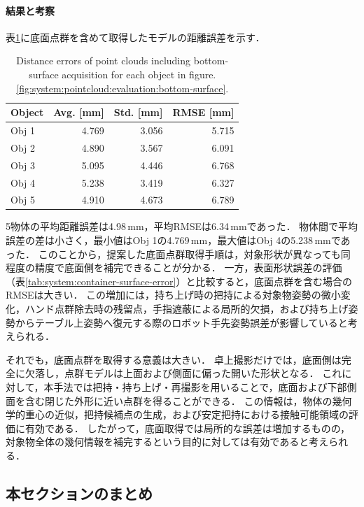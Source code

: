 \paragraph{結果と考察}

表\ref{tab:system:bottom-pointcloud}に底面点群を含めて取得したモデルの距離誤差を示す．

\begin{table}[t]
  \centering
  \caption{Distance errors of point clouds including bottom-surface acquisition for each object in figure.\ref{fig:system:pointcloud:evaluation:bottom-surface}.}
  \label{tab:system:bottom-pointcloud}
  \small
  \begin{tabular}{lrrr}
    \toprule
    \textbf{Object} & \textbf{Avg. [mm]} & \textbf{Std. [mm]} & \textbf{RMSE [mm]} \\
    \midrule
    Obj 1 & 4.769 & 3.056 & 5.715 \\
    Obj 2 & 4.890 & 3.567 & 6.091 \\
    Obj 3 & 5.095 & 4.446 & 6.768 \\
    Obj 4 & 5.238 & 3.419 & 6.327 \\
    Obj 5 & 4.910 & 4.673 & 6.789 \\
    \bottomrule
  \end{tabular}
\end{table}

5物体の平均距離誤差は4.98\,mm，平均RMSEは6.34\,mmであった．
物体間で平均誤差の差は小さく，最小値はObj 1の4.769\,mm，最大値はObj 4の5.238\,mmであった．
このことから，提案した底面点群取得手順は，対象形状が異なっても同程度の精度で底面側を補完できることが分かる．
一方，表面形状誤差の評価（表\ref{tab:system:container-surface-error}）と比較すると，底面点群を含む場合のRMSEは大きい．
この増加には，持ち上げ時の把持による対象物姿勢の微小変化，ハンド点群除去時の残留点，手指遮蔽による局所的欠損，および持ち上げ姿勢からテーブル上姿勢へ復元する際のロボット手先姿勢誤差が影響していると考えられる．

それでも，底面点群を取得する意義は大きい．
卓上撮影だけでは，底面側は完全に欠落し，点群モデルは上面および側面に偏った開いた形状となる．
これに対して，本手法では把持・持ち上げ・再撮影を用いることで，底面および下部側面を含む閉じた外形に近い点群を得ることができる．
この情報は，物体の幾何学的重心の近似，把持候補点の生成，および安定把持における接触可能領域の評価に有効である．
したがって，底面取得では局所的な誤差は増加するものの，対象物全体の幾何情報を補完するという目的に対しては有効であると考えられる．

\subsection{本セクションのまとめ}

